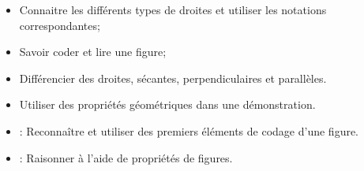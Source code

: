 \begin{myobj}
	\begin{itemize}
		\item Connaitre les différents types de droites et utiliser les notations correspondantes;
		\item Savoir coder et lire une figure;
		\item Différencier des droites, sécantes, perpendiculaires et parallèles.
		\item Utiliser des propriétés géométriques dans une démonstration.	
	\end{itemize}
\end{myobj}

\begin{mycomp}
	\begin{itemize}
		\item {} :  Reconnaître et utiliser des premiers éléments de codage d'une figure.
		\item {} :  Raisonner à l'aide de propriétés de figures.
		
	\end{itemize}
\end{mycomp}